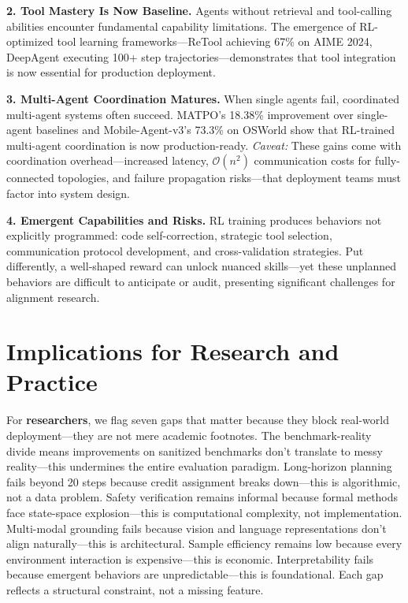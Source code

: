 \documentclass[12pt,a4paper]{report}
\theoremstyle{definition}
\begin{document}
\noindent\textbf{2. Tool Mastery Is Now Baseline.} Agents without retrieval and tool-calling abilities encounter fundamental capability limitations. The emergence of RL-optimized tool learning frameworks---ReTool achieving 67\% on AIME 2024, DeepAgent executing 100+ step trajectories---demonstrates that tool integration is now essential for production deployment.

\noindent\textbf{3. Multi-Agent Coordination Matures.} When single agents fail, coordinated multi-agent systems often succeed. MATPO's 18.38\% improvement over single-agent baselines and Mobile-Agent-v3's 73.3\% on OSWorld show that RL-trained multi-agent coordination is now production-ready. \textit{Caveat:} These gains come with coordination overhead---increased latency, $\mathcal{O}(n^2)$ communication costs for fully-connected topologies, and failure propagation risks---that deployment teams must factor into system design.

\noindent\textbf{4. Emergent Capabilities and Risks.} RL training produces behaviors not explicitly programmed: code self-correction, strategic tool selection, communication protocol development, and cross-validation strategies. Put differently, a well-shaped reward can unlock nuanced skills---yet these unplanned behaviors are difficult to anticipate or audit, presenting significant challenges for alignment research.

\section*{Implications for Research and Practice}

For \textbf{researchers}, we flag seven gaps that matter because they block real-world deployment---they are not mere academic footnotes. The benchmark-reality divide means improvements on sanitized benchmarks don't translate to messy reality—this undermines the entire evaluation paradigm. Long-horizon planning fails beyond 20 steps because credit assignment breaks down—this is algorithmic, not a data problem. Safety verification remains informal because formal methods face state-space explosion—this is computational complexity, not implementation. Multi-modal grounding fails because vision and language representations don't align naturally—this is architectural. Sample efficiency remains low because every environment interaction is expensive—this is economic. Interpretability fails because emergent behaviors are unpredictable—this is foundational. Each gap reflects a structural constraint, not a missing feature.
\end{document}
